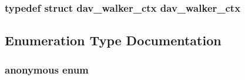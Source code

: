 \subsubsection[{\texorpdfstring{dav\+\_\+walker\+\_\+ctx}{dav_walker_ctx}}]{\setlength{\rightskip}{0pt plus 5cm}typedef struct {\bf dav\+\_\+walker\+\_\+ctx}  {\bf dav\+\_\+walker\+\_\+ctx}}\hypertarget{group__MOD__DAV_ga4019584d367580a1f462a4f38baeddfe}{}\label{group__MOD__DAV_ga4019584d367580a1f462a4f38baeddfe}


\subsection{Enumeration Type Documentation}
\subsubsection[{\texorpdfstring{anonymous enum}{anonymous enum}}]{\setlength{\rightskip}{0pt plus 5cm}anonymous enum}\hypertarget{group__MOD__DAV_ga726ca809ffd3d67ab4b8476646f26635}{}\label{group__MOD__DAV_ga726ca809ffd3d67ab4b8476646f26635}
